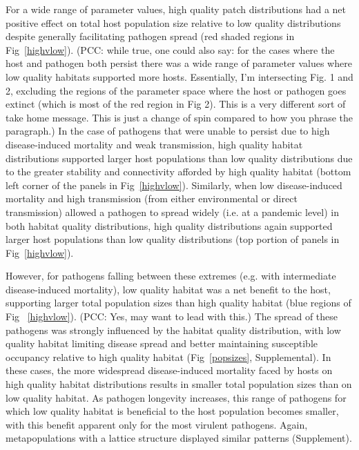 \documentclass{article}
\begin{document}
For a wide range of parameter values, high quality patch distributions had a net positive effect on total host population size relative to low quality distributions despite generally facilitating pathogen spread (red shaded regions in Fig~\ref{highvlow}).  (PCC: while true, one could also say: for the cases where the host and pathogen both persist there was a wide range of parameter values where low quality habitats supported more hosts.  Essentially, I'm intersecting Fig. 1 and 2, excluding the regions of the parameter space where the host or pathogen goes extinct (which is most of the red region in Fig 2). This is a very different sort of take home message. This is just a change of spin compared to how you phrase the paragraph.)
In the case of pathogens that were unable to persist due to high disease-induced mortality and weak transmission, high quality habitat distributions supported larger host populations than low quality distributions due to the greater stability and connectivity afforded by high quality habitat (bottom left corner of the panels in Fig~\ref{highvlow}). 
Similarly, when low disease-induced mortality and high transmission (from either environmental or direct transmission) allowed a pathogen to spread widely (i.e. at a pandemic level) in both habitat quality distributions, high quality distributions again supported larger host populations than low quality distributions (top portion of panels in Fig~\ref{highvlow}).

However, for pathogens falling between these extremes (e.g. with intermediate disease-induced mortality), low quality habitat was a net benefit to the host, supporting larger total population sizes than high quality habitat (blue regions of Fig ~\ref{highvlow}). (PCC: Yes, may want to lead with this.)
The spread of these pathogens was strongly influenced by the habitat quality distribution, with low quality habitat limiting disease spread and better maintaining susceptible occupancy relative to high quality habitat (Fig~\ref{popsizes}, Supplemental).
In these cases, the more widespread disease-induced mortality faced by hosts on high quality habitat distributions results in smaller total population sizes than on low quality habitat.
As pathogen longevity increases, this range of pathogens for which low quality habitat is beneficial to the host population becomes smaller, with this benefit apparent only for the most virulent pathogens.
Again, metapopulations with a lattice structure displayed similar patterns (Supplement).
\end{document}
